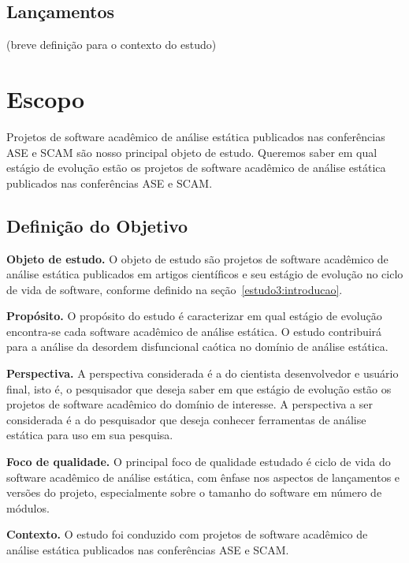 \subsection{Lançamentos}

(breve definição para o contexto do estudo)

\section{Escopo} \label{estudo3:escopo} %

Projetos de software acadêmico de análise estática publicados nas 
conferências ASE e SCAM 
são nosso principal objeto de estudo.
Queremos saber em qual estágio de evolução estão os projetos de software
acadêmico de análise estática publicados nas conferências ASE e SCAM.

\subsection{Definição do Objetivo}

\begin{description}

  \item{\bf Objeto de estudo.}
    O objeto de estudo são projetos de software acadêmico de análise estática
    publicados em artigos científicos e seu estágio de evolução no ciclo de
    vida de software, conforme definido na seção~\ref{estudo3:introducao}.

  \item{\bf Propósito.}
    O propósito do estudo é caracterizar em qual estágio de evolução
    encontra-se cada software acadêmico de análise estática. O estudo
    contribuirá para a análise da desordem disfuncional caótica no domínio de
    análise estática. 

  \item{\bf Perspectiva.}
    A perspectiva considerada é a do cientista desenvolvedor e usuário final, isto é, o pesquisador
    que deseja saber em que estágio de evolução estão os projetos de software acadêmico do domínio
    de interesse. A perspectiva a ser considerada é a do pesquisador que deseja
    conhecer ferramentas de análise estática para uso em sua pesquisa.

  \item{\bf Foco de qualidade.}
    O principal foco de qualidade estudado é ciclo de vida do software
    acadêmico de análise estática, com ênfase nos aspectos de lançamentos e
    versões do projeto, especialmente sobre o tamanho do software em número de
    módulos.

  \item{\bf Contexto.}
    O estudo foi conduzido com projetos de software acadêmico de análise
    estática publicados nas conferências ASE e SCAM.

\end{description}

